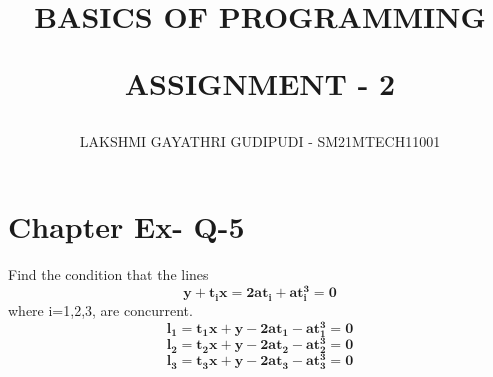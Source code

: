 \documentclass[journal,12pt,twocolumn]{IEEEtran}
\begin{document}
\newcommand{\myvec}[1]{\ensuremath{\begin{pmatrix}#1\end{pmatrix}}}
\newcommand{\cmyvec}[1]{\ensuremath{\begin{pmatrix*}[c]#1\end{pmatrix*}}}
\providecommand{\norm}[1]{\lVert#1\rVert}
\newcommand{\mydet}[1]{\ensuremath{\begin{vmatrix}#1\end{vmatrix}}}
\newcommand{\proj}[2]{\textbf{proj}_{\vec{#1}}\vec{#2}}
\newcommand{\abs}[1]{\left\lvert#1\right\rvert}
\newcommand{\RNum}[1]{\uppercase\expandafter{\romannumeral #1\relax}}
\newcommand{\Rnum}[1]{\lowercase\expandafter{\romannumeral #1\relax}}
\let\StandardTheFigure\thefigure
\let\vec\mathbf

\title{
BASICS OF PROGRAMMING

ASSIGNMENT - 2
}
\author{ LAKSHMI GAYATHRI GUDIPUDI - SM21MTECH11001}
\maketitle
\newpage
\bigskip
\renewcommand{\thefigure}{\theenumi}

\section*{ Chapter \RNum{3} Ex-\RNum{4} Q-5}
\noindent
Find the condition that the lines
$$\mathbf{y+t_i x=2at_i+at_i^3=0}$$
where i=1,2,3, are concurrent. 
$$\mathbf{l_1=t_1 x + y - 2at_1 -at_1^3=0}$$
$$\mathbf{l_2=t_2 x + y - 2at_2 -at_2^3=0}$$
$$\mathbf{l_3=t_3 x + y - 2at_3 -at_3^3=0}$$
\noindent
\end{document}
